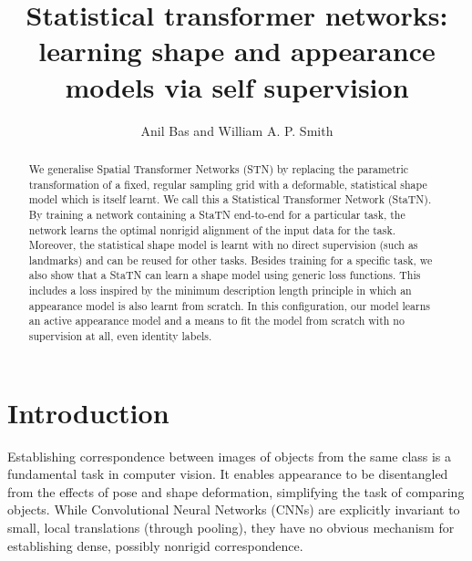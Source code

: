 \documentclass[runningheads]{llncs}
\begin{document}
\pagestyle{headings}
\mainmatter
\def\ECCV18SubNumber{2124}  %

\title{Statistical transformer networks: learning shape and appearance models via self supervision}



\author{Anil Bas and William A. P. Smith}

\maketitle

\begin{abstract}
We generalise Spatial Transformer Networks (STN) by replacing the parametric transformation of a fixed, regular sampling grid with a deformable, statistical shape model which is itself learnt. We call this a Statistical Transformer Network (StaTN). By training a network containing a StaTN end-to-end for a particular task, the network learns the optimal nonrigid alignment of the input data for the task. Moreover, the statistical shape model is learnt with no direct supervision (such as landmarks) and can be reused for other tasks. Besides training for a specific task, we also show that a StaTN can learn a shape model using generic loss functions. This includes a loss inspired by the minimum description length principle in which an appearance model is also learnt from scratch. In this configuration, our model learns an active appearance model and a means to fit the model from scratch with no supervision at all, even identity labels.
\end{abstract}

\section{Introduction}

Establishing correspondence between images of objects from the same class is a fundamental task in computer vision. It enables appearance to be disentangled from the effects of pose and shape deformation, simplifying the task of comparing objects. While Convolutional Neural Networks (CNNs) are explicitly invariant to small, local translations (through pooling), they have no obvious mechanism for establishing dense, possibly nonrigid correspondence. 
\end{document}
